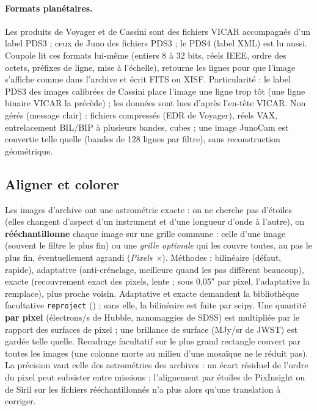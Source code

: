 \paragraph{Formats planétaires.} Les produits de Voyager et de Cassini sont des fichiers VICAR accompagnés d'un label
PDS3 ; ceux de Juno des fichiers PDS3 ; le PDS4 (label XML) est lu aussi. Coupole lit ces formats lui-même (entiers
8 à 32 bits, réels IEEE, ordre des octets, préfixes de ligne, mise à l'échelle), retourne les lignes pour que l'image
s'affiche comme dans l'archive et écrit FITS ou XISF. Particularité : le label PDS3 des images calibrées de Cassini
place l'image une ligne trop tôt (une ligne binaire VICAR la précède) ; les données sont lues d'après l'en-tête
VICAR. Non gérés (message clair) : fichiers compressés (EDR de Voyager), réels VAX, entrelacement BIL/BIP à
plusieurs bandes, cubes ; une image JunoCam est convertie telle quelle (bandes de 128 lignes par filtre), sans
reconstruction géométrique.

\subsection{Aligner et colorer}
Les images d'archive ont une astrométrie exacte : on ne cherche pas d'étoiles (elles changent d'aspect d'un
instrument et d'une longueur d'onde à l'autre), on \textbf{rééchantillonne} chaque image sur une grille commune :
celle d'une image (souvent le filtre le plus fin) ou une \emph{grille optimale} qui les couvre toutes, au pas le plus
fin, éventuellement agrandi (\emph{Pixels ×}). Méthodes : bilinéaire (défaut, rapide), adaptative (anti-crénelage,
meilleure quand les pas diffèrent beaucoup), exacte (recouvrement exact des pixels, lente ; sous 0,05″ par pixel,
l'adaptative la remplace), plus proche voisin. Adaptative et exacte demandent la bibliothèque facultative
\texttt{reproject} () ; sans elle, la bilinéaire est faite par scipy. Une quantité
\textbf{par pixel} (électrons/s de Hubble, nanomaggies de SDSS) est multipliée par le rapport des surfaces de pixel ;
une brillance de surface (MJy/sr de JWST) est gardée telle quelle. Recadrage facultatif sur le plus grand rectangle
couvert par toutes les images (une colonne morte au milieu d'une mosaïque ne le réduit pas). La précision vaut celle
des astrométries des archives : un écart résiduel de l'ordre du pixel peut subsister entre missions ; l'alignement
par étoiles de PixInsight ou de Siril sur les fichiers rééchantillonnés n'a plus alors qu'une translation à corriger.

